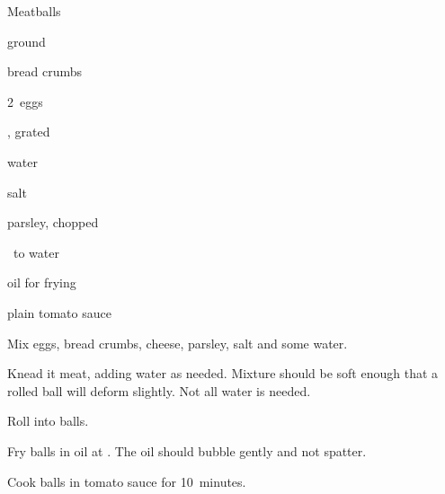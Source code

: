 \begin{recipe}{Meatballs}{}{}

\begin{ingredients}
\item {} ground 
\item {} bread crumbs
\item 2~eggs
\item {} , grated
\item {} water
\item {} salt
\item parsley, chopped
\item \quarter\ to \C{\half} water
\item oil for frying
\item plain tomato sauce
\end{ingredients}

\begin{directions}
\item Mix eggs, bread crumbs, cheese, parsley, salt and some water.
\item Knead it meat, adding water as needed. Mixture should be soft enough that a rolled ball will deform slightly. Not all water is needed.
\item Roll into balls.
\item Fry balls in oil at . The oil should bubble gently and not spatter.
\item Cook balls in tomato sauce for 10~minutes.
\end{directions}

\end{recipe}
